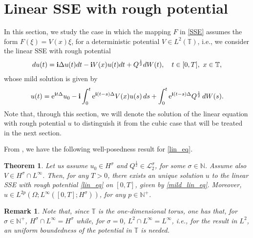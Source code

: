 \documentclass[a4paper]{amsart}
\newtheorem{theorem}{Theorem}[section]
\newtheorem{remark}{Remark}[section]
\begin{document}
\section{Linear SSE with rough potential}
In this section, we study the case in which the mapping $F$ in \eqref{SSE} assumes the form $F(\xi)=V(x)\xi$, for a deterministic potential $V\in L^2(\mathbb{T})$, i.e., we consider the linear SSE with rough potential
\begin{equation}
    \label{lin_eq}
du(t)={\bf i}\Delta u(t) dt-{\bf i}V(x)u(t) dt+Q^{\frac{1}{2}}dW(t), \quad t\in[0,T], \ x \in \mathbb{T}, 
\end{equation}
whose mild solution is given by
\begin{equation}
    \label{mild_lin_eq}
u(t)={\rm e}^{{\bf i}t\Delta } u_0 -{\bf i}\int_{0}^{t}{\rm e}^{{\bf i}(t-s)\Delta}V(x)u(s)\,ds+\int_{0}^{t}{\rm e}^{{\bf i}(t-s)\Delta}Q^{\frac{1}{2}}\,dW(s). 
\end{equation}
Note that, through this section, we will denote the solution of the linear equation with rough potential $u$ to distinguish it from the cubic case that will be treated in the next section.

From \cite{an_co}, we have the following well-posedness result for \eqref{lin_eq}.
\begin{theorem}
\label{wp_lin}
    Let us assume $u_0 \in H^\sigma$ and $Q^{\frac{1}{2}}\in\mathcal{L}_2^\sigma$, for some $\sigma\in\mathbb{N}$. Assume also $V\in H^\sigma \cap L^\infty$.
    Then, for any $T>0$, there exists an unique solution $u$ to the linear SSE with rough potential \eqref{lin_eq} on $[0,T]$, given by \eqref{mild_lin_eq}.  Moreover, $u\in L^{2p}(\Omega; L^{\infty}([0,T];H^\sigma))$, for any $p\in\mathbb{N}^+$.
\end{theorem}

\begin{remark}
    Note that, since $\mathbb{T}$ is the one-dimensional torus, one has that, for $\sigma\in\mathbb{N}^+$, $H^\sigma \cap L^\infty=H^\sigma$ while, for $\sigma=0$, $L^2\cap L^\infty = L^\infty$, i.e., for the result in $L^2$, an uniform boundedness of the potential in $\mathbb{T}$ is needed.
\end{remark}
\end{document}
